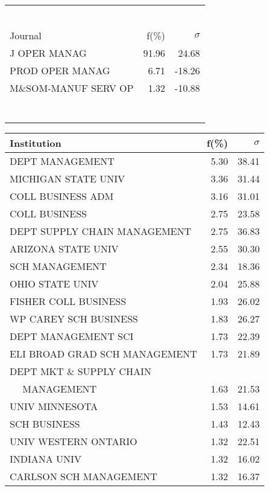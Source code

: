 \documentclass[a4paper,11pt]{report}
\begin{document}
\begin{landscape}
\begin{table}[!ht]
{\begin{tabular}{|l r  r|}
 &  & \\
 &  & \\
 &  & \\
 &  & \\
 &  & \\
 &  & \\
\hline
\hline
Journal & f(\%) & $\sigma$\\
\hline
J OPER MANAG & 91.96 & 24.68\\
PROD OPER MANAG & 6.71 & -18.26\\
M\&SOM-MANUF SERV OP & 1.32 & -10.88\\
 &  & \\
 &  & \\
 &  & \\
 &  & \\
 &  & \\
 &  & \\
 &  & \\
\hline
\end{tabular}
}
{\scriptsize\begin{tabular}{|l r r|}
\hline
Institution & f(\%) & $\sigma$\\
\hline
DEPT MANAGEMENT & 5.30 & 38.41\\
MICHIGAN STATE UNIV & 3.36 & 31.44\\
COLL BUSINESS ADM & 3.16 & 31.01\\
COLL BUSINESS & 2.75 & 23.58\\
DEPT SUPPLY CHAIN MANAGEMENT & 2.75 & 36.83\\
ARIZONA STATE UNIV & 2.55 & 30.30\\
SCH MANAGEMENT & 2.34 & 18.36\\
OHIO STATE UNIV & 2.04 & 25.88\\
FISHER COLL BUSINESS & 1.93 & 26.02\\
WP CAREY SCH BUSINESS & 1.83 & 26.27\\
DEPT MANAGEMENT SCI & 1.73 & 22.39\\
ELI BROAD GRAD SCH MANAGEMENT & 1.73 & 21.89\\
DEPT MKT \& SUPPLY CHAIN &  & \\
$\quad$ MANAGEMENT & 1.63 & 21.53\\
UNIV MINNESOTA & 1.53 & 14.61\\
SCH BUSINESS & 1.43 & 12.43\\
UNIV WESTERN ONTARIO & 1.32 & 22.51\\
INDIANA UNIV & 1.32 & 16.02\\
CARLSON SCH MANAGEMENT & 1.32 & 16.37\\

\end{tabular}}
\end{table}
\end{landscape}
\end{document}
